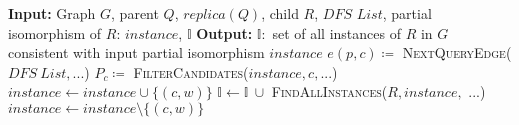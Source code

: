 \documentclass[MTech]{iitddiss}
\begin{document}
\begin{algorithm}
  \dontprintsemicolon
  \nonl {}\;
	\nonl \textbf{Input:} Graph $G$, parent $Q$, $replica(Q)$, child $R$, $DFS$ $List$, partial isomorphism of $R$: $instance$, $\mathbb{I}$\;
	\nonl \textbf{Output:} $\mathbb{I}: $ set of all instances of $R$ in $G$ consistent with input partial isomorphism $instance$\;
	{
	}
	\Else
	{
		$e(p,c) \coloneq$ \textsc{NextQueryEdge($DFS\ List, ...$)}\;
		$P_{c} \coloneq$ \textsc{FilterCandidates($instance, c, ...$)}\;
		{
			$instance \leftarrow instance \cup \{(c,w)\}$\;
			$\mathbb{I} \leftarrow \mathbb{I}\ \cup$ \textsc{FindAllInstances($R,instance,$ ...)}\;
			$instance \leftarrow instance \setminus \{(c,w)\}$\;
		}
		\;
	}
\end{algorithm}
\end{document}

